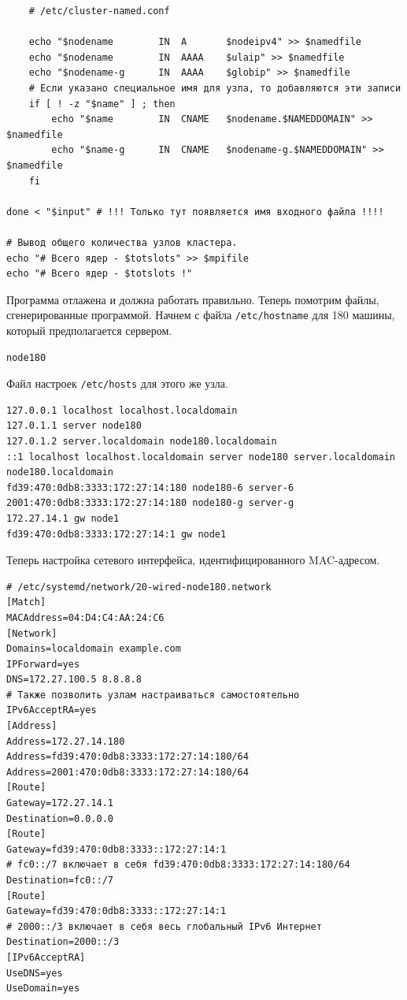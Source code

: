 \documentclass[12pt]{article}
\begin{document}
\begin{verbatim}
    # /etc/cluster-named.conf

    echo "$nodename        IN  A       $nodeipv4" >> $namedfile
    echo "$nodename        IN  AAAA    $ulaip" >> $namedfile
    echo "$nodename-g      IN  AAAA    $globip" >> $namedfile
    # Если указано специальное имя для узла, то добавляются эти записи
    if [ ! -z "$name" ] ; then
        echo "$name        IN  CNAME   $nodename.$NAMEDDOMAIN" >> $namedfile
        echo "$name-g      IN  CNAME   $nodename-g.$NAMEDDOMAIN" >> $namedfile
    fi

done < "$input" # !!! Только тут появляется имя входного файла !!!!

# Вывод общего количества узлов кластера.
echo "# Всего ядер - $totslots" >> $mpifile
echo "# Всего ядер - $totslots !"
\end{verbatim}

Программа отлажена и должна работать правильно. Теперь помотрим файлы, сгенерированные программой. Начнем с файла \texttt{/etc/hostname} для 180 машины, который предполагается сервером.
\begin{verbatim}
node180
\end{verbatim}

Файл настроек \texttt{/etc/hosts} для этого же узла.
\begin{verbatim}
127.0.0.1 localhost localhost.localdomain
127.0.1.1 server node180
127.0.1.2 server.localdomain node180.localdomain
::1 localhost localhost.localdomain server node180 server.localdomain node180.localdomain
fd39:470:0db8:3333:172:27:14:180 node180-6 server-6
2001:470:0db8:3333:172:27:14:180 node180-g server-g
172.27.14.1 gw node1
fd39:470:0db8:3333:172:27:14:1 gw node1
\end{verbatim}

Теперь настройка сетевого интерфейса, идентифицированного MAC-адресом.
\begin{verbatim}
# /etc/systemd/network/20-wired-node180.network
[Match]
MACAddress=04:D4:C4:AA:24:C6
[Network]
Domains=localdomain example.com
IPForward=yes
DNS=172.27.100.5 8.8.8.8
# Также позволить узлам настраиваться самостоятельно
IPv6AcceptRA=yes
[Address]
Address=172.27.14.180
Address=fd39:470:0db8:3333:172:27:14:180/64
Address=2001:470:0db8:3333:172:27:14:180/64
[Route]
Gateway=172.27.14.1
Destination=0.0.0.0
[Route]
Gateway=fd39:470:0db8:3333::172:27:14:1
# fc0::/7 включает в себя fd39:470:0db8:3333:172:27:14:180/64
Destination=fc0::/7
[Route]
Gateway=fd39:470:0db8:3333::172:27:14:1
# 2000::/3 включает в себя весь глобальный IPv6 Интернет
Destination=2000::/3
[IPv6AcceptRA]
UseDNS=yes
UseDomain=yes
\end{verbatim}
\end{document}
